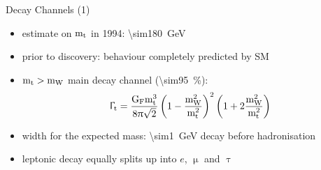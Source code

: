 \begin{frame}{Decay Channels (1)}

	\begin{itemize}\itemfill
		\item estimate on $\text{m}_{\text{t}}$ in 1994: \SI{\sim180}{\giga\electronvolt}
		\item prior to discovery: behaviour completely predicted by SM
		\item $\text{m}_{\text{t}} > \text{m}_{\text{W}}$ \ra main decay channel (\SI{\sim95}{\%}):
		\begin{equation*} \Upgamma_{\text{t}} = \frac{\text{G}_{\text{F}}\text{m}_{\text{t}}^{3}}{8\uppi\sqrt{2}}\left(1 - \frac{\text{m}_{\text{W}}^{2}}{\text{m}_{\text{t}}^{2}}\right)^{2}\left(1 + 2\frac{\text{m}_{\text{W}}^{2}}{\text{m}_{\text{t}}^{2}}\right)\end{equation*}
		\item width for the expected mass: \SI{\sim1}{\giga\electronvolt} \ra decay before hadronisation
	\end{itemize}
	
	\begin{figure}\vspace*{-10pt}
		\centering
	\end{figure}\vspace*{-10pt}
	
	\begin{itemize}\itemfill
		\item leptonic decay equally splits up into $e$, $\upmu$ and $\uptau$
	\end{itemize}

\end{frame}
